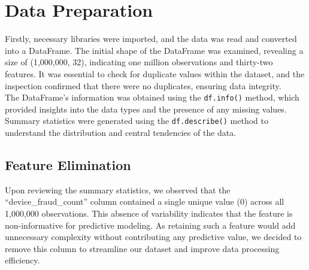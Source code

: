 \documentclass[12pt,a4paper]{report}
\begin{document}
\clearpage

\section{Data Preparation}
Firstly, necessary libraries were imported, and the data was read and converted into a DataFrame. The initial shape of the DataFrame was examined, revealing a size of (1,000,000, 32), indicating one million observations and thirty-two features. It was essential to check for duplicate values within the dataset, and the inspection confirmed that there were no duplicates, ensuring data integrity.\\


The DataFrame's information was obtained using the \texttt{df.info()} method, which provided insights into the data types and the presence of any missing values. Summary statistics were generated using the \texttt{df.describe()} method to understand the distribution and central tendencies of the data. 

\subsection{Feature Elimination}

Upon reviewing the summary statistics, we observed that the ``device\_fraud\_count'' column contained a single unique value (0) across all 1,000,000 observations. This absence of variability indicates that the feature is non-informative for predictive modeling. As retaining such a feature would add unnecessary complexity without contributing any predictive value, we decided to remove this column to streamline our dataset and improve data processing efficiency.\\
\end{document}
